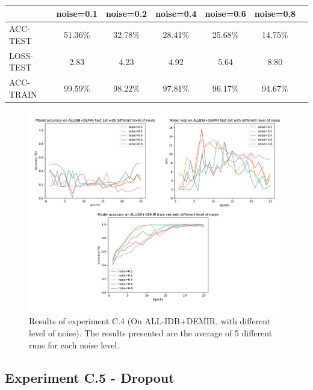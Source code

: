 \documentclass[11pt, openany]{report}
\theoremstyle{plain}
\theoremstyle{definition}
\theoremstyle{remark}
\begin{document}
\begin{center}
\begin{tabular}{|l|c|c|c|c|c|c|}
  \hline
   & \textbf{noise=0.1} & \textbf{noise=0.2} & \textbf{noise=0.4} & \textbf{noise=0.6} & \textbf{noise=0.8}\\
  \hline
  ACC-TEST & 51.36\% & 32.78\% & 28.41\% & 25.68\% & 14.75\%\\
  LOSS-TEST & 2.83 & 4.23 & 4.92 &  5.64 & 8.80 \\ 
  ACC-TRAIN & 99.59\% & 98.22\% & 97.81\% & 96.17\% & 94.67\% \\ 
  \hline
\end{tabular}
\label{table:results-C4}
\end{center}

\begin{figure}[H]
  \centering
  \includegraphics[scale=0.45]{Code/ch6-LeukemiaSubtypes/figures_result/LEUK-SUBTYPES/leukSub-noise.PNG}
  \caption{Results of experiment C.4 (On ALL-IDB+DEMIR, with different level of noise). The results presented are the average of 5 different runs for each noise level.}
  \label{fig:results-C4}
\end{figure}


\subsection{Experiment C.5 - Dropout}
\end{document}
